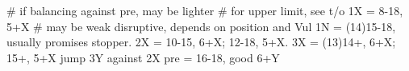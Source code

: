 # if balancing against pre, may be lighter
# for upper limit, see t/o
1X = 8-18, 5+X  # may be weak disruptive, depends on position and Vul 
1N = (14)15-18, usually promises stopper.
2X = 10-15, 6+X; 12-18, 5+X.
3X = (13)14+, 6+X; 15+, 5+X
jump 3Y against 2X pre = 16-18, good 6+Y